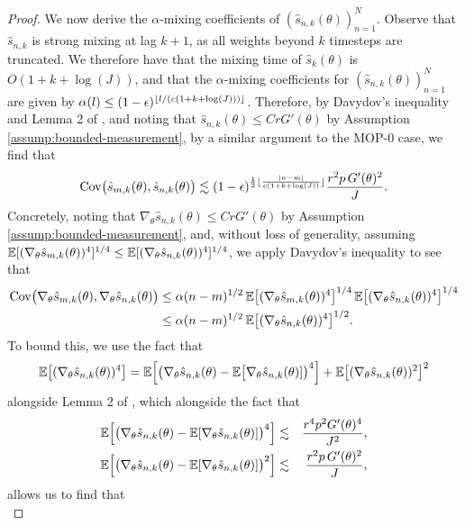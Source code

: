 \begin{proof}
We now derive the $\alpha$-mixing coefficients of $(\hat s_{n,k}(\theta))_{n=1}^N$. Observe that $\hat s_{n,k}$ is strong mixing at lag $k+1$, as all weights beyond $k$ timesteps are truncated. We therefore have that the mixing time of $\hat s_k(\theta)$ is $O(1+k+\log(J))$, and that the $\alpha$-mixing coefficients for $(\hat s_{n,k}(\theta))_{n=1}^N$ are given by $\alpha(l) \leq (1-\epsilon)^{\lfloor l/(c(1+k+\log(J))) \rfloor}$.
Therefore, by Davydov's inequality and Lemma 2 of \cite{karjalainen23}, and noting that $\hat s_{n,k}(\theta) \leq CrG'(\theta)$ by Assumption \ref{assump:bounded-measurement}, by a similar argument to the MOP-0 case, we find that 
\begin{equation}
\mathrm{Cov}\big(\hat s_{m,k}(\theta), \hat s_{n,k}(\theta)\big) \lesssim (1-\epsilon)^{\frac{1}{2}\lfloor \frac{|n-m|}{c(1+k+\log(J))} \rfloor}\frac{r^2p \, G'(\theta)^2}{J}.
\end{equation}
Concretely, noting that $\nabla_\theta\hat s_{n,k}(\theta)\leq CrG'(\theta)$ by Assumption \ref{assump:bounded-measurement}, and, without loss of generality, assuming $\mathbb{E}[(\nabla_\theta\hat s_{m,k}(\theta))^4]^{1/4}\leq\mathbb{E}[(\nabla_\theta\hat s_{n,k}(\theta))^4]^{1/4}$, we apply Davydov's inequality to see that
\begin{align}
    \mathrm{Cov}\big(\nabla_\theta\hat s_{m,k}(\theta), \nabla_\theta\hat s_{n,k}(\theta)\big) 
    &\leq \alpha(n-m)^{1/2} \, \mathbb{E}\big[(\nabla_\theta\hat s_{m,k}(\theta))^4\big]^{1/4} \, \mathbb{E}\big[(\nabla_\theta\hat s_{n,k}(\theta))^4\big]^{1/4}\\
    &\leq \alpha(n-m)^{1/2} \, \mathbb{E}\big[(\nabla_\theta\hat s_{n,k}(\theta))^4\big]^{1/2}.
\end{align}
To bound this, we use the fact that 
\begin{equation}
\mathbb{E}\big[(\nabla_\theta\hat s_{n,k}(\theta))^4\big] = \mathbb{E}\Big[\big(\nabla_\theta\hat s_{n,k}(\theta)-\mathbb{E}\big[\nabla_\theta\hat s_{n,k}(\theta)]\big)^4\Big]+\mathbb{E}\big[(\nabla_\theta\hat s_{n,k}(\theta))^2\big]^2
\end{equation}
alongside Lemma 2 of \cite{karjalainen23}, which alongside the fact that
\begin{eqnarray}
\mathbb{E}\Big[\big(\nabla_\theta\hat s_{n,k}(\theta)-\mathbb{E}[\nabla_\theta\hat s_{n,k}(\theta)]\big)^4\Big] &\lesssim& \frac{r^4p^2G'(\theta)^4}{J^2}, 
\\
\mathbb{E}\Big[\big(\nabla_\theta\hat s_{n,k}(\theta)-\mathbb{E}[\nabla_\theta\hat s_{n,k}(\theta)]\big)^2\Big] &\lesssim& \frac{r^2p \, G'(\theta)^2}{J},
\end{eqnarray}
allows us to find that 
\begin{equation}

\end{equation}
\end{proof}
